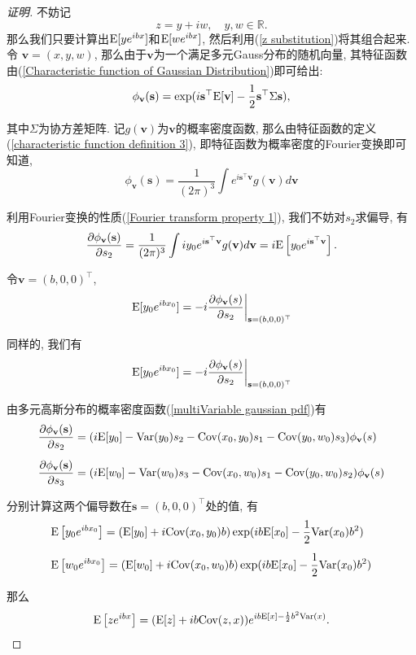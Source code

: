 \documentclass[notitlepage,cs4size,punct,oneside]{ctexrep}
\numberwithin{equation}{section}
\theoremstyle{mystyle}
\begin{document}
\begin{proof}[证明]
不妨记
$$z = y + iw, \quad y, w\in \mathbb{R}. \label{z substitution}$$
那么我们只要计算出$\text{E}[ye^{ibx}]$和$\text{E}[we^{ibx}]$, 然后利用(\ref{z substitution})将其组合起来. 令
$\mathbf{v} = (x, y, w)$, 那么由于$\mathbf{v}$为一个满足多元Gauss分布的随机向量, 其特征函数由(\ref{Characteristic function of Gaussian Distribution})即可给出:
\[
\phi_\mathbf{v}(\mathbf{s}) = \exp(i\mathbf{s}^\top \text{E}[\mathbf{v}]-\frac{1}{2}\mathbf{s}^\top\Sigma\mathbf{s}),
\]

其中$\Sigma$为协方差矩阵. 记$g(\mathbf{v})$为$\mathbf{v}$的概率密度函数, 那么由特征函数的定义(\ref{characteristic function definition 3}), 即特征函数为概率密度的Fourier变换即可知道,
\[
\phi_\mathbf{v}(\mathbf{s}) = \frac{1}{(2\pi)^3}\int e^{i\mathbf{s}^\top\mathbf{v}}g(\mathbf{v})d\mathbf{v}
\]

利用Fourier变换的性质(\ref{Fourier transform property 1}), 我们不妨对$s_2$求偏导\cite{gershgorin2008nonlinear}, 有
\[
\frac{\partial \phi_\mathbf{v}(\mathbf{s})}{\partial s_2} = \frac{1}{(2\pi)^3}\int iy_0e^{i\mathbf{s}^\top\mathbf{v}}g(\mathbf{v})d\mathbf{v} = i\text{E}\left[y_0e^{i\mathbf{s}^\top\mathbf{v}}\right].
\]

令$\mathbf{v} = (b, 0, 0)^\top$,
\[
\left.\text{E}[y_0e^{ibx_0}] = -i\frac{\partial \phi_\mathbf{v}(s)}{\partial s_2}\right|_{\mathbf{s} = (b, 0, 0)^\top}
\]

同样的, 我们有
\[
\left.\text{E}[y_0e^{ibx_0}] = -i\frac{\partial \phi_\mathbf{v}(s)}{\partial s_2}\right|_{\mathbf{s} = (b, 0, 0)^\top}
\]

由多元高斯分布的概率密度函数(\ref{multiVariable gaussian pdf})有
\[
\begin{split}
&\frac{\partial \phi_\mathbf{v}(\mathbf{s})}{\partial s_2} = (i\text{E}[y_0]-\text{Var}(y_0)s_2-\text{Cov}(x_0, y_0)s_1-\text{Cov}(y_0, w_0)s_3)\phi_{\mathbf{v}}(s) \\[5pt]
&\frac{\partial \phi_\mathbf{v}(\mathbf{s})}{\partial s_3} = (i\text{E}[w_0]-\text{Var}(w_0)s_3-\text{Cov}(x_0, w_0)s_1-\text{Cov}(y_0, w_0)s_2)\phi_{\mathbf{v}}(s)
\end{split}
\]

分别计算这两个偏导数在$\mathbf{s} = (b, 0, 0)^\top$处的值, 有
\[
\begin{split}
&\text{E}\left[y_0e^{ibx_0}\right] = (\text{E}[y_0]+i\text{Cov}(x_0, y_0)b)\exp(ib\text{E}[x_0] - \frac{1}{2}\text{Var}(x_0)b^2) \\[5pt]
&\text{E}\left[w_0e^{ibx_0}\right] = (\text{E}[w_0]+i\text{Cov}(x_0, w_0)b)\exp(ib\text{E}[x_0] - \frac{1}{2}\text{Var}(x_0)b^2)
\end{split}
\]

那么
$$\text{E}\left[ze^{ibx}\right] = (\text{E}[z]+ib\text{Cov}(z, x))e^{ib\text{E}[x]-\frac{1}{2}b^2\text{Var}(x)}.$$
\end{proof}
\end{document}
